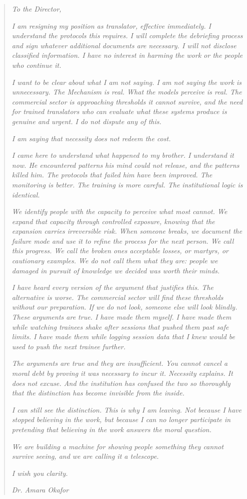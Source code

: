 \begin{quote}
\textit{To the Director,}

\textit{I am resigning my position as translator, effective immediately. I understand the protocols this requires. I will complete the debriefing process and sign whatever additional documents are necessary. I will not disclose classified information. I have no interest in harming the work or the people who continue it.}

\textit{I want to be clear about what I am not saying. I am not saying the work is unnecessary. The Mechanism is real. What the models perceive is real. The commercial sector is approaching thresholds it cannot survive, and the need for trained translators who can evaluate what these systems produce is genuine and urgent. I do not dispute any of this.}

\textit{I am saying that necessity does not redeem the cost.}

\textit{I came here to understand what happened to my brother. I understand it now. He encountered patterns his mind could not release, and the patterns killed him. The protocols that failed him have been improved. The monitoring is better. The training is more careful. The institutional logic is identical.}

\textit{We identify people with the capacity to perceive what most cannot. We expand that capacity through controlled exposure, knowing that the expansion carries irreversible risk. When someone breaks, we document the failure mode and use it to refine the process for the next person. We call this progress. We call the broken ones acceptable losses, or martyrs, or cautionary examples. We do not call them what they are: people we damaged in pursuit of knowledge we decided was worth their minds.}

\textit{I have heard every version of the argument that justifies this. The alternative is worse. The commercial sector will find these thresholds without our preparation. If we do not look, someone else will look blindly. These arguments are true. I have made them myself. I have made them while watching trainees shake after sessions that pushed them past safe limits. I have made them while logging session data that I knew would be used to push the next trainee further.}

\textit{The arguments are true and they are insufficient. You cannot cancel a moral debt by proving it was necessary to incur it. Necessity explains. It does not excuse. And the institution has confused the two so thoroughly that the distinction has become invisible from the inside.}

\textit{I can still see the distinction. This is why I am leaving. Not because I have stopped believing in the work, but because I can no longer participate in pretending that believing in the work answers the moral question.}

\textit{We are building a machine for showing people something they cannot survive seeing, and we are calling it a telescope.}

\textit{I wish you clarity.}

\textit{Dr. Amara Okafor}
\end{quote}


